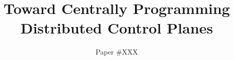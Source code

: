 \documentclass{sig-alternate-10pt}
\begin{document}
\setlength{\pdfpageheight}{\paperheight}
\setlength{\pdfpagewidth}{\paperwidth}

\title{Toward Centrally Programming Distributed Control Planes}
\author{Paper \#XXX}

\maketitle





%










\end{document}
